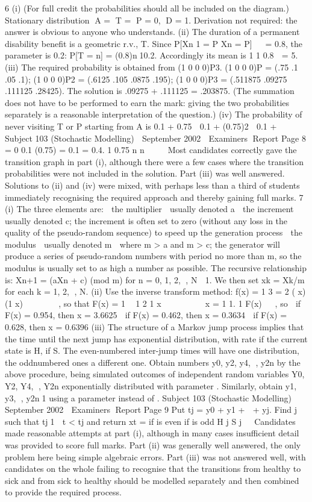 6 (i)
(For full credit the probabilities should all be included on the diagram.)
Stationary distribution A = T = P = 0, D = 1. Derivation not required: the
answer is obvious to anyone who understands.
(ii) The duration of a permanent disability benefit is a geometric r.v., T.
Since P[Xn 1 = P Xn = P]   = 0.8, the parameter is 0.2:
P[T = n] = (0.8)n10.2. Accordingly its mean is 1
1 0.8 
= 5.
(iii) The required probability is obtained from (1 0 0 0)P3.
(1 0 0 0)P = (.75 .1 .05 .1); (1 0 0 0)P2 = (.6125 .105 .0875 .195);
(1 0 0 0)P3 = (.511875 .09275 .111125 .28425).
The solution is .09275 + .111125 = .203875.
(The summation does not have to be performed to earn the mark: giving the
two probabilities separately is a reasonable interpretation of the question.)
(iv) The probability of never visiting T or P starting from A is
0.1 + 0.75  0.1 + (0.75)2  0.1 + 
Subject 103 (Stochastic Modelling)  September 2002  Examiners Report
Page 8
=
0
0.1 (0.75) = 0.1 = 0.4.
1 0.75
n
n




Most candidates correctly gave the transition graph in part (i), although there were a few
cases where the transition probabilities were not included in the solution. Part (iii) was well
answered. Solutions to (ii) and (iv) were mixed, with perhaps less than a third of students
immediately recognising the required approach and thereby gaining full marks.
7 (i) The three elements are:
  the multiplier  usually denoted a
  the increment  usually denoted c; the increment is often set to zero
(without any loss in the quality of the pseudo-random sequence) to speed
up the generation process
  the modulus  usually denoted m  where m > a and m > c; the
generator will produce a series of pseudo-random numbers with period no
more than m, so the modulus is usually set to as high a number as possible.
The recursive relationship is: Xn+1 = (aXn + c) (mod m) for n = 0, 1, 2, ,
N  1. We then set xk = Xk/m for each k = 1, 2, , N.
(ii) Use the inverse transform method:
f(x) = 1 3
= 2
( x) (1 x)



 
, so that F(x) = 1 
1 2
1 x
 
    
 x = 1 1.
1 F(x) 

, so
  if F(x) = 0.954, then x = 3.6625
  if F(x) = 0.462, then x = 0.3634
  if F(x) = 0.628, then x = 0.6396
(iii) The structure of a Markov jump process implies that the time until the next
jump has exponential distribution, with rate 	 if the current state is H, 
 if S.
The even-numbered inter-jump times will have one distribution, the oddnumbered
ones a different one.
Obtain numbers y0, y2, y4, , y2n by the above procedure, being simulated
outcomes of independent random variables Y0, Y2, Y4, , Y2n exponentially
distributed with parameter 	. Similarly, obtain y1, y3, , y2n1 using a
parameter 
 instead of 	.
Subject 103 (Stochastic Modelling)  September 2002  Examiners Report
Page 9
Put tj = y0 + y1 +  + yj. Find j such that tj1  t < tj and return
xt =
if is even
if is odd
H j
S j

Candidates made reasonable attempts at part (i), although in many cases insufficient detail
was provided to score full marks. Part (ii) was generally well answered, the only problem
here being simple algebraic errors. Part (iii) was not answered well, with candidates on the
whole failing to recognise that the transitions from healthy to sick and from sick to healthy
should be modelled separately and then combined to provide the required process.
